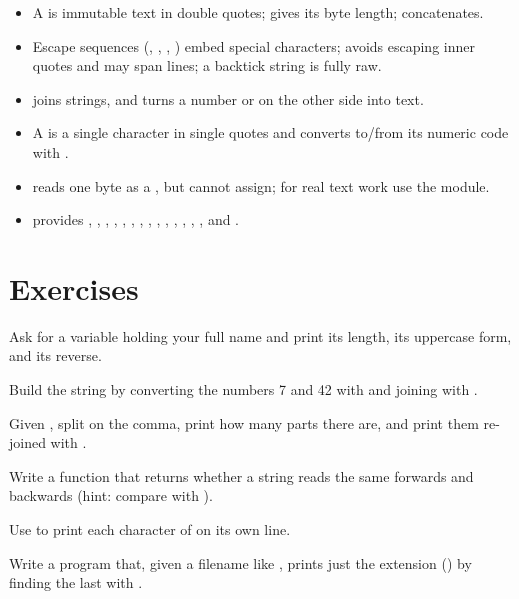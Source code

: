 \begin{itemize}[leftmargin=1.4em]
  \item A  is immutable text in double quotes;  gives its
        byte length; \code{+} concatenates.
  \item Escape sequences (, ,
        , \code{\textbackslash\textbackslash}) embed
        special characters;  avoids escaping inner quotes and
        may span lines; a backtick string is fully raw.
  \item \code{+} joins strings, and turns a number or  on the other
        side into text.
  \item A  is a single character in single quotes and converts to/from
        its numeric code with .
  \item {} reads one byte as a , but cannot assign; for real
        text work use the  module.
  \item \begin{sloppypar}
         provides , , ,
        , , , ,
        , , , ,
        , , , and .
        \end{sloppypar}
\end{itemize}

\section{Exercises}

\exercise Ask for a  variable holding your full name and print its
length, its uppercase form, and its reverse.

\exercise Build the string  by converting the numbers
7 and 42 with  and joining with \code{+}.

\exercise Given , split on the comma, print how many
parts there are, and print them re-joined with .

\exercise Write a function  that returns whether
a string reads the same forwards and backwards (hint: compare  with
).

\exercise Use  to print each character of  on its
own line.

\exercise Write a program that, given a filename like , prints
just the extension () by finding the last  with
.
